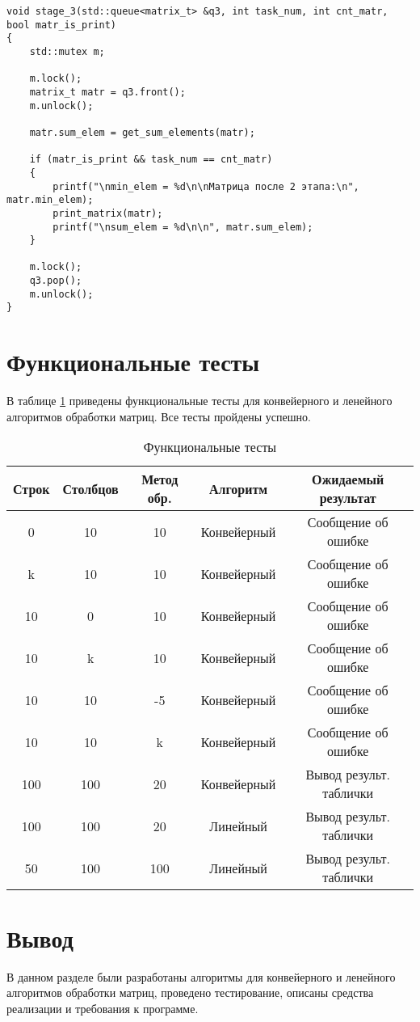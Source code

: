 \clearpage

\begin{center}
\captionsetup{justification=raggedright,singlelinecheck=off}
\begin{lstlisting}[label=lst:stage_3,caption=Функция реализации 3-его этапа обработки матрицы]
void stage_3(std::queue<matrix_t> &q3, int task_num, int cnt_matr, bool matr_is_print)
{
	std::mutex m;

	m.lock();
	matrix_t matr = q3.front();
	m.unlock();

	matr.sum_elem = get_sum_elements(matr);
	
	if (matr_is_print && task_num == cnt_matr)
	{
		printf("\nmin_elem = %d\n\nМатрица после 2 этапа:\n", matr.min_elem);        
		print_matrix(matr);
		printf("\nsum_elem = %d\n\n", matr.sum_elem);
	}

	m.lock();
	q3.pop();
	m.unlock();
}
\end{lstlisting}
\end{center}

\clearpage

\section{Функциональные тесты}

В таблице \ref{tbl:functional_test} приведены функциональные тесты для конвейерного и ленейного алгоритмов обработки матриц. Все тесты пройдены успешно.

\begin{table}[h]
	\begin{center}
	\begin{threeparttable}
		\captionsetup{justification=raggedright,singlelinecheck=off}
		\caption{\label{tbl:functional_test} Функциональные тесты}
		\begin{tabular}{|c|c|c|c|c|}
			\hline
			Строк & Столбцов & Метод обр. & Алгоритм & Ожидаемый результат 
			\\ \hline
			0 & 10 & 10 & Конвейерный & Сообщение об ошибке 
			\\ \hline
			k & 10 & 10 & Конвейерный & Сообщение об ошибке 
			\\ \hline
			10 & 0 & 10 & Конвейерный & Сообщение об ошибке 
			\\ \hline
			10 & k & 10 & Конвейерный & Сообщение об ошибке 
			\\ \hline
			10 & 10 & -5 & Конвейерный & Сообщение об ошибке 
			\\ \hline
			10 & 10 & k & Конвейерный & Сообщение об ошибке 
			\\ \hline
			100 & 100 & 20 & Конвейерный & Вывод результ. таблички
			\\ \hline
			100 & 100 & 20 & Линейный & Вывод результ. таблички
			\\ \hline
			50 & 100 & 100 & Линейный & Вывод результ. таблички
			\\ \hline
		\end{tabular}
	\end{threeparttable}
	\end{center}
\end{table}

\section*{Вывод}

В данном разделе были разработаны алгоритмы для конвейерного и ленейного алгоритмов обработки матриц, проведено тестирование, описаны средства реализации и требования к программе.
